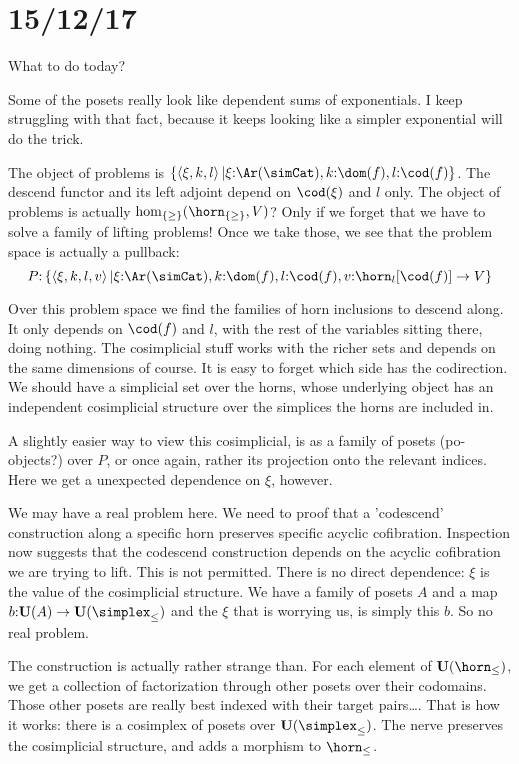 \documentclass[csh.tex]{subfiles}
\begin{document}
\section{15/12/17}
What to do today?

Some of the posets really look like dependent sums of exponentials. I keep struggling with that fact, because it keeps looking like a simpler exponential will do the trick.

The object of problems is $\set{ \tuplet{\xi,k,l} | \xi\of\Ar(\simCat), k\of \dom(f), l\of\cod(f) }$.
The descend functor and its left adjoint depend on $\cod(\xi)$ and $l$ only.
The object of problems is actually $\hom_{\set\geq}(\horn_{\set\geq},V)$? Only if we forget that we have to solve a family of lifting problems!
Once we take those, we see that the problem space is actually a pullback:
\[ P\of \set{ \tuplet{\xi,k,l,v} | \xi\of\Ar(\simCat), k\of \dom(f), l\of\cod(f), v\of\horn_l[\cod(f)]\to V } \]

Over this problem space we find the families of horn inclusions to descend along. It only depends on $\cod(f)$ and $l$, with the rest of the variables sitting there, doing nothing.
The cosimplicial stuff works with the richer sets and depends on the same dimensions of course. It is easy to forget which side has the codirection.
We should have a simplicial set over the horns, whose underlying object has an independent cosimplicial structure over the simplices the horns are included in.

A slightly easier way to view this cosimplicial, is as a family of posets (po-objects?) over $P$, or once again, rather its projection onto the relevant indices. Here we get a unexpected dependence on $\xi$, however.

We may have a real problem here. We need to proof that a 'codescend' construction along a specific horn preserves specific acyclic cofibration. Inspection now suggests that the codescend construction depends on the acyclic cofibration we are trying to lift. This is not permitted.
There is no direct dependence: $\xi$ is the value of the cosimplicial structure. We have a family of posets $A$ and a map $b\of\base(A)\to\base(\simplex_\leq)$ and the $\xi$ that is worrying us, is simply this $b$. So no real problem.

The construction is actually rather strange than. For each element of $\base(\horn_\leq)$, we get a collection of factorization through other posets over their codomains. Those other posets are really best indexed with their target pairs\dots.
That is how it works: there is a cosimplex of posets over $\base(\simplex_\leq)$. The nerve preserves the cosimplicial structure, and adds a morphism to $\horn_\leq$. 
\end{document}
